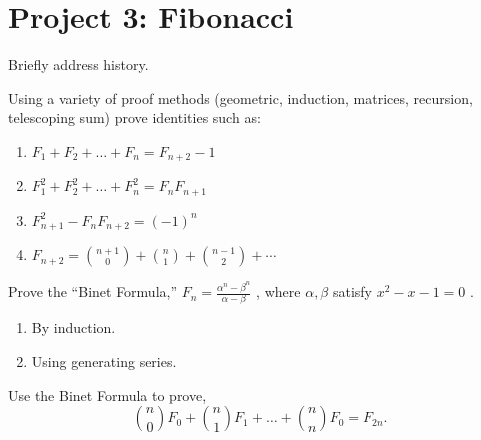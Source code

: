 \documentclass[10pt,]{book}
\theoremstyle{plain}
\theoremstyle{definition}
\theoremstyle{definition}
\theoremstyle{definition}
\theoremstyle{definition}
\numberwithin{equation}{chapter}
\begin{document}
\typeout{************************************************}
\typeout{************************************************}
\section[{Project 3: Fibonacci}]{Project 3: Fibonacci}\label{exercises-13}
\begin{divisionexercise}{1}\hypertarget{exercise-139}{}
\hypertarget{p-1293}{}%
Briefly address history.%
\end{divisionexercise}%
\begin{divisionexercise}{2}\hypertarget{exercise-140}{}
\hypertarget{p-1294}{}%
Using a variety of proof methods (geometric, induction, matrices, recursion, telescoping sum) prove identities such as: \leavevmode%
\begin{enumerate}[label=(\alph*)]
\item\hypertarget{li-251}{}\hypertarget{p-1295}{}%
\(F_{1} + F_{2} + \ldots + F_{n} = F_{n + 2} - 1\)%
\item\hypertarget{li-252}{}\hypertarget{p-1296}{}%
\(F_{1}^{2} + F_{2}^{2} + \ldots + F_{n}^{2} = F_{n}F_{n + 1}\)%
\item\hypertarget{li-253}{}\hypertarget{p-1297}{}%
\(F_{n + 1}^{2} - F_{n}F_{n + 2} = \left( - 1 \right)^{n}\)%
\item\hypertarget{li-254}{}\hypertarget{p-1298}{}%
\(F_{n + 2} = \binom{n + 1}{0} + \binom{n}{1} + \binom{n - 1}{2} + \cdots\)%
\end{enumerate}
%
\end{divisionexercise}%
\begin{divisionexercise}{3}\hypertarget{exercise-141}{}
\hypertarget{p-1299}{}%
Prove the ``Binet Formula,'' \(F_{n} = \frac{\alpha^{n} - \beta^{n}}{\alpha - \beta}\) , where \(\alpha,\beta\) satisfy \(x^{2} - x - 1 = 0\) . \leavevmode%
\begin{enumerate}[label=(\alph*)]
\item\hypertarget{li-255}{}\hypertarget{p-1300}{}%
By induction.%
\item\hypertarget{li-256}{}\hypertarget{p-1301}{}%
Using generating series.%
\end{enumerate}
%
\end{divisionexercise}%
\begin{divisionexercise}{4}\hypertarget{exercise-142}{}
\hypertarget{p-1302}{}%
Use the Binet Formula to prove,%
\begin{equation*}
\binom{n}{0}F_{0} + \binom{n}{1} F_{1} + \ldots + \binom{n}{n}F_{0} = F_{2n}.
\end{equation*}
%
\end{divisionexercise}%
\end{document}
